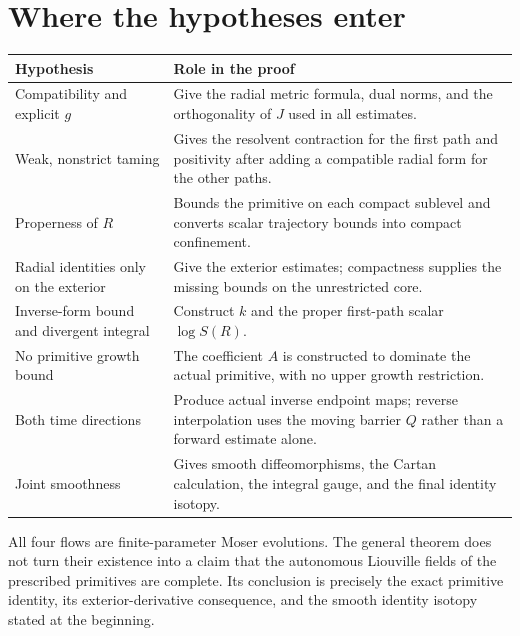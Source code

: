 \section{Where the hypotheses enter}
\begin{tabularx}{\textwidth}{@{}p{}X@{}}
\toprule
Hypothesis & Role in the proof\\
\midrule
Compatibility and explicit $g$ &
Give the radial metric formula, dual norms, and the orthogonality
of $J$ used in all estimates.\\
Weak, nonstrict taming &
Gives the resolvent contraction for the first path and positivity
after adding a compatible radial form for the other paths.\\
Properness of $R$ &
Bounds the primitive on each compact sublevel and converts
scalar trajectory bounds into compact confinement.\\
Radial identities only on the exterior &
Give the exterior estimates; compactness supplies the missing
bounds on the unrestricted core.\\
Inverse-form bound and divergent integral &
Construct $k$ and the proper first-path scalar $\log S(R)$.\\
No primitive growth bound &
The coefficient $A$ is constructed to dominate the actual
primitive, with no upper growth restriction.\\
Both time directions &
Produce actual inverse endpoint maps; reverse interpolation
uses the moving barrier $Q$ rather than a forward estimate alone.\\
Joint smoothness &
Gives smooth diffeomorphisms, the Cartan calculation, the
integral gauge, and the final identity isotopy.\\
\bottomrule
\end{tabularx}

\medskip
All four flows are finite-parameter Moser evolutions.
The general theorem does not turn their existence into a
claim that the autonomous Liouville fields of the prescribed
primitives are complete. Its conclusion is precisely the exact
primitive identity, its exterior-derivative consequence, and
the smooth identity isotopy stated at the beginning.

